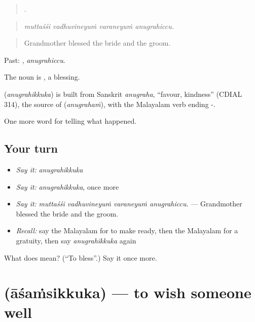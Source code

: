 \begin{quote}
   .
\end{quote}

\begin{quote}
\emph{muttaśśi vadhuvineyuṁ varaneyuṁ anugrahiccu.}
\end{quote}

\begin{quote}
Grandmother blessed the bride and the groom.
\end{quote}

Past: , \emph{anugrahiccu}.

The noun is , a blessing.

\begin{cousinweb}
\textbf{} (\emph{anugrahikkuka}) is built from Sanskrit \emph{anugraha}, \textquotedblleft{}favour, kindness\textquotedblright{} (CDIAL 314), the source of  (\emph{anugrahaṁ}), with the Malayalam verb ending -.
\end{cousinweb}

\begin{grammarlens}[title={What you've built}]
One more word for telling what happened.
\end{grammarlens}

\subsection*{Your turn}
\begin{itemize}
\raggedright
  \item \emph{Say it:} \emph{anugrahikkuka}
  \item \emph{Say it:} \emph{anugrahikkuka}, once more
  \item \emph{Say it:} \emph{muttaśśi vadhuvineyuṁ varaneyuṁ anugrahiccu.} — Grandmother blessed the bride and the groom.
  \item \emph{Recall:} say the Malayalam for to make ready, then the Malayalam for a gratuity, then say \emph{anugrahikkuka} again
\end{itemize}

\begin{tcolorbox}[breakable,colback=teal!4,colframe=teal!35!black,title={Before you move on}]
What does  mean? (\textquotedblleft{}To bless\textquotedblright{}.) Say it once more.
\end{tcolorbox}
\section[\texorpdfstring{\ml{ആശംസിക്കുക} (āśaṁsikkuka)}{ആശംസിക്കുക (āśaṁsikkuka)}]{ (āśaṁsikkuka) — to wish someone well}

